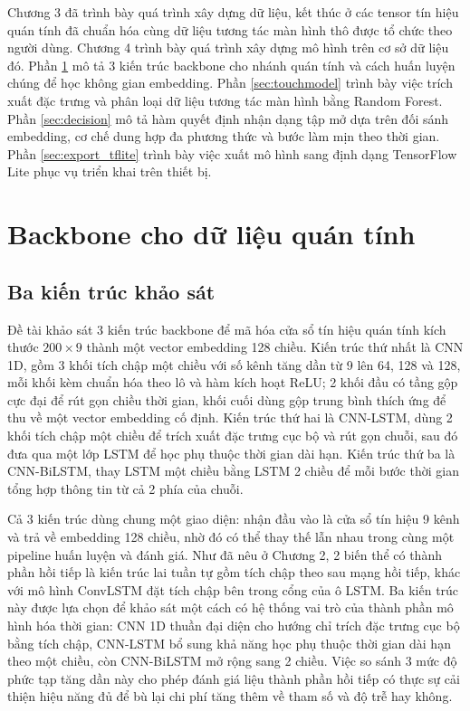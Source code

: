 \documentclass[../DoAn.tex]{subfiles}
\begin{document}
Chương 3 đã trình bày quá trình xây dựng dữ liệu, kết thúc ở các tensor tín hiệu quán tính đã chuẩn hóa cùng dữ liệu tương tác màn hình thô được tổ chức theo người dùng. Chương 4 trình bày quá trình xây dựng mô hình trên cơ sở dữ liệu đó. Phần \ref{sec:backbone} mô tả 3 kiến trúc backbone cho nhánh quán tính và cách huấn luyện chúng để học không gian embedding. Phần \ref{sec:touchmodel} trình bày việc trích xuất đặc trưng và phân loại dữ liệu tương tác màn hình bằng Random Forest. Phần \ref{sec:decision} mô tả hàm quyết định nhận dạng tập mở dựa trên đối sánh embedding, cơ chế dung hợp đa phương thức và bước làm mịn theo thời gian. Phần \ref{sec:export_tflite} trình bày việc xuất mô hình sang định dạng TensorFlow Lite phục vụ triển khai trên thiết bị.

\section{Backbone cho dữ liệu quán tính}
\label{sec:backbone}

\subsection{Ba kiến trúc khảo sát}

Đề tài khảo sát 3 kiến trúc backbone để mã hóa cửa sổ tín hiệu quán tính kích thước $200 \times 9$ thành một vector embedding 128 chiều. Kiến trúc thứ nhất là CNN 1D, gồm 3 khối tích chập một chiều với số kênh tăng dần từ 9 lên 64, 128 và 128, mỗi khối kèm chuẩn hóa theo lô và hàm kích hoạt ReLU; 2 khối đầu có tầng gộp cực đại để rút gọn chiều thời gian, khối cuối dùng gộp trung bình thích ứng để thu về một vector embedding cố định. Kiến trúc thứ hai là CNN-LSTM, dùng 2 khối tích chập một chiều để trích xuất đặc trưng cục bộ và rút gọn chuỗi, sau đó đưa qua một lớp LSTM để học phụ thuộc thời gian dài hạn. Kiến trúc thứ ba là CNN-BiLSTM, thay LSTM một chiều bằng LSTM 2 chiều để mỗi bước thời gian tổng hợp thông tin từ cả 2 phía của chuỗi.

Cả 3 kiến trúc dùng chung một giao diện: nhận đầu vào là cửa sổ tín hiệu 9 kênh và trả về embedding 128 chiều, nhờ đó có thể thay thế lẫn nhau trong cùng một pipeline huấn luyện và đánh giá. Như đã nêu ở Chương 2, 2 biến thể có thành phần hồi tiếp là kiến trúc lai tuần tự gồm tích chập theo sau mạng hồi tiếp, khác với mô hình ConvLSTM đặt tích chập bên trong cổng của ô LSTM. Ba kiến trúc này được lựa chọn để khảo sát một cách có hệ thống vai trò của thành phần mô hình hóa thời gian: CNN 1D thuần đại diện cho hướng chỉ trích đặc trưng cục bộ bằng tích chập, CNN-LSTM bổ sung khả năng học phụ thuộc thời gian dài hạn theo một chiều, còn CNN-BiLSTM mở rộng sang 2 chiều. Việc so sánh 3 mức độ phức tạp tăng dần này cho phép đánh giá liệu thành phần hồi tiếp có thực sự cải thiện hiệu năng đủ để bù lại chi phí tăng thêm về tham số và độ trễ hay không.
\end{document}
